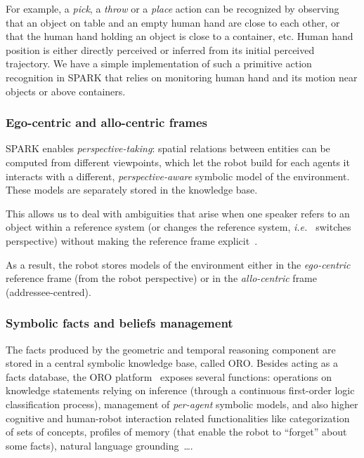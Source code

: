 \documentclass[preprint,12pt]{elsarticle}
\newcommand{\ie}{{\textit{i.e.\ }}}
\begin{document}
For example, a \emph{pick}, a \emph{throw} or a \emph{place} action
can be recognized by observing that an object on table and an empty
human hand are close to each other, or that the human hand holding an
object is close to a container, etc. Human hand position is either
directly perceived or inferred from its initial perceived trajectory.
We have a simple implementation of such a primitive action recognition
in SPARK that relies on monitoring human hand and its motion near
objects or above containers.


\subsubsection{Ego-centric and allo-centric frames}

SPARK enables \emph{perspective-taking}: spatial relations between entities can
be computed from different viewpoints, which let the robot build for each
agents it interacts with a different, \emph{perspective-aware} symbolic model
of the environment. These models are separately stored in the knowledge base.

This allows us to deal with ambiguities that arise when one speaker refers to
an object within a reference system (or changes the reference system, \ie
switches perspective) without making the reference frame
explicit~\cite{Breazeal2006, Ros2010}.

As a result, the robot stores models of the environment either in the
\emph{ego-centric} reference frame (from the robot perspective) or in the
\emph{allo-centric} frame (addressee-centred).


\subsubsection{Symbolic facts and beliefs management}

The facts produced by the geometric and temporal reasoning component
are stored in a central symbolic knowledge base, called ORO. Besides
acting as a facts database, the ORO platform~\cite{Lemaignan2010}
exposes several functions: operations on knowledge statements relying
on inference (through a continuous first-order logic classification
process), management of \emph{per-agent} symbolic models, and also
higher cognitive and human-robot interaction related functionalities
like categorization of sets of concepts, profiles of memory (that
enable the robot to ``forget'' about some facts), natural language
grounding~\cite{Lemaignan2011}\ldots.
\end{document}
